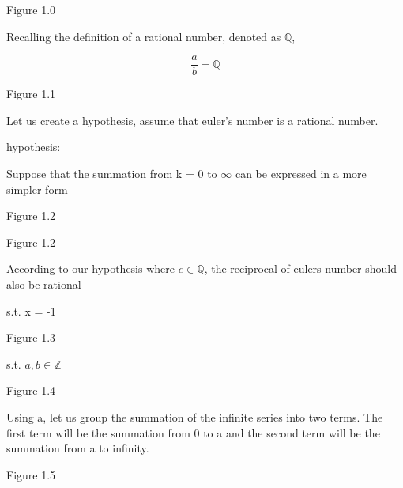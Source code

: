 \documentclass[12pt, a4paper]{article}
\begin{document}
\raggedleft

{\small Figure 1.0}

\centering
\vspace{0.5cm}



Recalling the definition of a rational number, denoted as $\mathbb{Q}$,

\vspace{0.5cm}
{\fontsize{17.28}{18pt}\selectfont
\[
\frac{a}{b} = \mathbb{Q}
\]
}

\raggedleft

{\small Figure 1.1}

\vspace{0.5cm}
\raggedright

Let us create a hypothesis, assume that euler's number is a rational number.
\newline

hypothesis: \centering {\fontsize{17.28}{18pt}\selectfont
\[e \in \mathbb{Q}
\]
}

\raggedright%

Suppose that the summation from k = 0 to $\infty$ can be expressed in a more simpler form

\centering{\fontsize{17.28pt}{18pt}\selectfont
\[ \sum_{k=0}^\infty \frac{1}{k!} = \frac{1}{0!} + \frac{1}{1!} + \frac{1}{2!} ... + \frac{1}{k!} = \frac{a}{b}
\]
}

\raggedleft

{\small Figure 1.2}

\centering{\fontsize{17.28pt}{18pt}\selectfont
\[ e = \frac{a}{b}
\]
}
\raggedleft

{\small Figure 1.2}

\vspace{0.5cm}

\raggedright

According to our hypothesis where $e \in \mathbb{Q}$, the reciprocal of eulers number
should also be rational

\centering{\fontsize{17.28pt}{18pt}\selectfont
\[ e = \frac{a}{b} \quad = \quad e^{x} = \frac{b}{a}
\]
} s.t. x = -1

\raggedleft
{\small Figure 1.3}

\centering{\fontsize{17.28pt}{18pt}\selectfont
\[ e^{-1} = \frac{1}{e} = \frac{b}{a} = \sum_{k=0}^\infty \frac{(-1)^{k}}{k!}
\]
} s.t. $a,b \in \mathbb{Z}$

\raggedleft
{\small Figure 1.4}

\raggedright

Using a, let us group the summation of the infinite series into two terms. The first term will be the summation from 0 to a and the second 
term will be the summation from a to infinity. 

\centering{\fontsize{17.28pt}{18pt}\selectfont
\[ e^{-1} = \sum_{k=0}^{a} \frac{(-1)^{k}}{k!} + \sum_{k = a + 1}^{\infty} \frac{(-1)^{k}}{k!}
\]
}

\raggedleft
{\small Figure 1.5}

\raggedright
\end{document}
